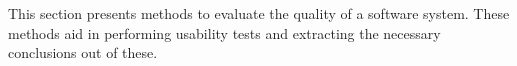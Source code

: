 This section presents methods to evaluate the quality of a software system. These methods aid in performing usability tests and extracting the necessary conclusions out of these.


%

